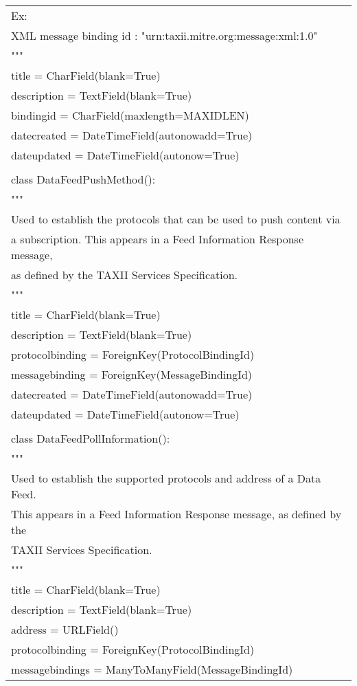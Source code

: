 \begin{center}
\begin{longtable}{|l|}
	    Ex:\\
	    XML message binding id : "urn:taxii.mitre.org:message:xml:1.0"\\
	    """\\
	    title = CharField(blank=True)\\
	    description = TextField(blank=True)\\
	    bindingid = CharField(maxlength=MAXIDLEN)\\
	    datecreated = DateTimeField(autonowadd=True)\\
	    dateupdated = DateTimeField(autonow=True)\\
	\\
	class DataFeedPushMethod():\\
	    """\\
	    Used to establish the protocols that can be used to push content via\\
	    a subscription. This appears in a Feed Information Response message,\\
	    as defined by the TAXII Services Specification.\\
	    """\\
	    title = CharField(blank=True)\\
	    description = TextField(blank=True)\\
	    protocolbinding = ForeignKey(ProtocolBindingId)\\
	    messagebinding = ForeignKey(MessageBindingId)\\
	    datecreated = DateTimeField(autonowadd=True)\\
	    dateupdated = DateTimeField(autonow=True)\\
	\\
	class DataFeedPollInformation():\\
	    """\\
	    Used to establish the supported protocols and address of a Data Feed.\\
	    This appears in a Feed Information Response message, as defined by the\\
	    TAXII Services Specification.\\
	    """\\
	    title = CharField(blank=True)\\
	    description = TextField(blank=True)\\
	    address = URLField()\\
	    protocolbinding = ForeignKey(ProtocolBindingId)\\
	    messagebindings = ManyToManyField(MessageBindingId)\\

\end{longtable}
\end{center}
